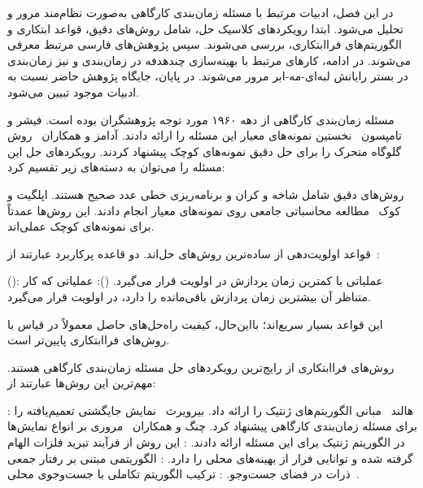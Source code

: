 
در این فصل، ادبیات مرتبط با مسئله زمان‌بندی کارگاهی به‌صورت نظام‌مند مرور و تحلیل می‌شود.
ابتدا رویکردهای کلاسیک حل، شامل روش‌های دقیق، قواعد ابتکاری
و الگوریتم‌های فراابتکاری، بررسی می‌شوند.
سپس پژوهش‌های فارسی مرتبط معرفی می‌شوند.
در ادامه، کارهای مرتبط با بهینه‌سازی چندهدفه در زمان‌بندی
و نیز زمان‌بندی در بستر رایانش لبه‌ای-مه-ابر مرور می‌شوند.
در پایان، جایگاه پژوهش حاضر نسبت به ادبیات موجود تبیین می‌شود.


مسئله زمان‌بندی کارگاهی از دهه ۱۹۶۰ مورد توجه پژوهشگران بوده است.
فیشر و تامپسون~\cite{fisher1963probabilistic} نخستین نمونه‌های معیار این مسئله را ارائه دادند.
آدامز و همکاران~\cite{adams1988shifting} روش گلوگاه متحرک
را برای حل دقیق نمونه‌های کوچک پیشنهاد کردند.
رویکردهای حل این مسئله را می‌توان به دسته‌های زیر تقسیم کرد:


روش‌های دقیق شامل شاخه و کران
و برنامه‌ریزی خطی عدد صحیح هستند.
اپلگیت و کوک~\cite{applegate1991computational}
مطالعه محاسباتی جامعی روی نمونه‌های معیار انجام دادند.
این روش‌ها عمدتاً برای نمونه‌های کوچک عملی‌اند.


قواعد اولویت‌دهی از ساده‌ترین روش‌های حل‌اند.
دو قاعده پرکاربرد عبارتند از~\cite{pinedo2016scheduling}:

  ():
عملیاتی با کمترین زمان پردازش در اولویت قرار می‌گیرد.
  ():
عملیاتی که کار متناظر آن بیشترین زمان پردازش باقی‌مانده را دارد، در اولویت قرار می‌گیرد.

این قواعد بسیار سریع‌اند؛ بااین‌حال، کیفیت راه‌حل‌های حاصل معمولاً در قیاس با روش‌های فراابتکاری پایین‌تر است.


روش‌های فراابتکاری از رایج‌ترین رویکردهای حل مسئله زمان‌بندی کارگاهی هستند.
مهم‌ترین این روش‌ها عبارتند از:

 :
هالند~\cite{holland1975adaptation} مبانی الگوریتم‌های ژنتیک را ارائه داد.
بیرویرث~\cite{bierwirth1995generalized} نمایش جایگشتی تعمیم‌یافته را برای مسئله زمان‌بندی کارگاهی پیشنهاد کرد.
چنگ و همکاران~\cite{cheng1996tutorial} مروری بر انواع نمایش‌ها در الگوریتم ژنتیک برای این مسئله ارائه دادند.
 :
این روش از فرآیند تبرید فلزات الهام گرفته شده و توانایی فرار از بهینه‌های محلی را دارد.
 :
الگوریتمی مبتنی بر رفتار جمعی ذرات در فضای جست‌وجو.
 :
ترکیب الگوریتم تکاملی با جست‌وجوی محلی~\cite{moscato1989evolution}.


